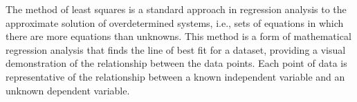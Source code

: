 The method of least squares is a standard approach in regression analysis to the approximate solution of overdetermined systems, i.\+e., sets of equations in which there are more equations than unknowns. This method is a form of mathematical regression analysis that finds the line of best fit for a dataset, providing a visual demonstration of the relationship between the data points. Each point of data is representative of the relationship between a known independent variable and an unknown dependent variable. 